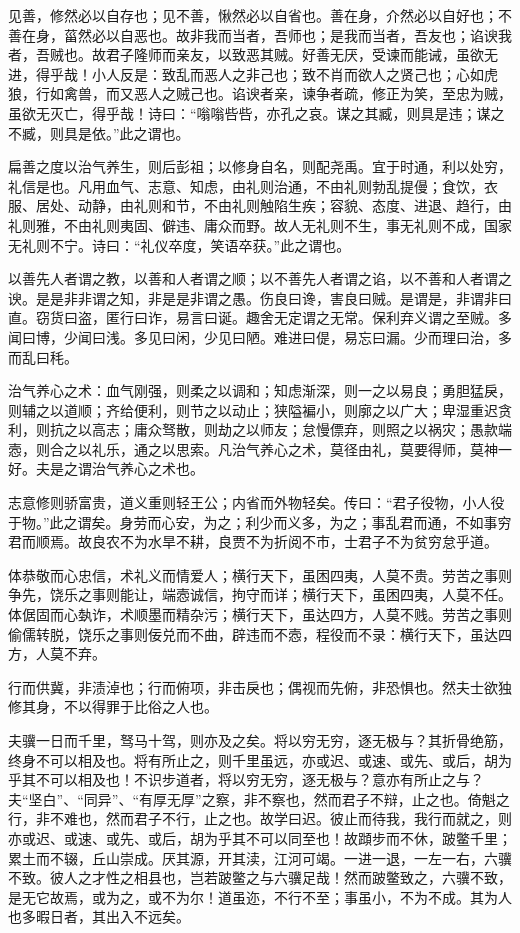 \documentclass[]{article}
\begin{document}
见善，修然必以自存也；见不善，愀然必以自省也。善在身，介然必以自好也；不善在身，菑然必以自恶也。故非我而当者，吾师也；是我而当者，吾友也；谄谀我者，吾贼也。故君子隆师而亲友，以致恶其贼。好善无厌，受谏而能诫，虽欲无进，得乎哉！小人反是：致乱而恶人之非己也；致不肖而欲人之贤己也；心如虎狼，行如禽兽，而又恶人之贼己也。谄谀者亲，谏争者疏，修正为笑，至忠为贼，虽欲无灭亡，得乎哉！诗曰：``嗡嗡呰呰，亦孔之哀。谋之其臧，则具是违；谋之不臧，则具是依。''此之谓也。

扁善之度以治气养生，则后彭祖；以修身自名，则配尧禹。宜于时通，利以处穷，礼信是也。凡用血气、志意、知虑，由礼则治通，不由礼则勃乱提僈；食饮，衣服、居处、动静，由礼则和节，不由礼则触陷生疾；容貌、态度、进退、趋行，由礼则雅，不由礼则夷固、僻违、庸众而野。故人无礼则不生，事无礼则不成，国家无礼则不宁。诗曰：``礼仪卒度，笑语卒获。''此之谓也。

以善先人者谓之教，以善和人者谓之顺；以不善先人者谓之谄，以不善和人者谓之谀。是是非非谓之知，非是是非谓之愚。伤良曰谗，害良曰贼。是谓是，非谓非曰直。窃货曰盗，匿行曰诈，易言曰诞。趣舍无定谓之无常。保利弃义谓之至贼。多闻曰博，少闻曰浅。多见曰闲，少见曰陋。难进曰偍，易忘曰漏。少而理曰治，多而乱曰秏。

治气养心之术：血气刚强，则柔之以调和；知虑渐深，则一之以易良；勇胆猛戾，则辅之以道顺；齐给便利，则节之以动止；狭隘褊小，则廓之以广大；卑湿重迟贪利，则抗之以高志；庸众驽散，则劫之以师友；怠慢僄弃，则照之以祸灾；愚款端悫，则合之以礼乐，通之以思索。凡治气养心之术，莫径由礼，莫要得师，莫神一好。夫是之谓治气养心之术也。

志意修则骄富贵，道义重则轻王公；内省而外物轻矣。传曰：``君子役物，小人役于物。''此之谓矣。身劳而心安，为之；利少而义多，为之；事乱君而通，不如事穷君而顺焉。故良农不为水旱不耕，良贾不为折阅不市，士君子不为贫穷怠乎道。

体恭敬而心忠信，术礼义而情爱人；横行天下，虽困四夷，人莫不贵。劳苦之事则争先，饶乐之事则能让，端悫诚信，拘守而详；横行天下，虽困四夷，人莫不任。体倨固而心埶诈，术顺墨而精杂污；横行天下，虽达四方，人莫不贱。劳苦之事则偷儒转脱，饶乐之事则佞兑而不曲，辟违而不悫，程役而不录：横行天下，虽达四方，人莫不弃。

行而供冀，非渍淖也；行而俯项，非击戾也；偶视而先俯，非恐惧也。然夫士欲独修其身，不以得罪于比俗之人也。

夫骥一日而千里，驽马十驾，则亦及之矣。将以穷无穷，逐无极与？其折骨绝筋，终身不可以相及也。将有所止之，则千里虽远，亦或迟、或速、或先、或后，胡为乎其不可以相及也！不识步道者，将以穷无穷，逐无极与？意亦有所止之与？夫``坚白''、``同异''、``有厚无厚''之察，非不察也，然而君子不辩，止之也。倚魁之行，非不难也，然而君子不行，止之也。故学曰迟。彼止而待我，我行而就之，则亦或迟、或速、或先、或后，胡为乎其不可以同至也！故蹞步而不休，跛鳖千里；累土而不辍，丘山崇成。厌其源，开其渎，江河可竭。一进一退，一左一右，六骥不致。彼人之才性之相县也，岂若跛鳖之与六骥足哉！然而跛鳖致之，六骥不致，是无它故焉，或为之，或不为尔！道虽迩，不行不至；事虽小，不为不成。其为人也多暇日者，其出入不远矣。
\end{document}

